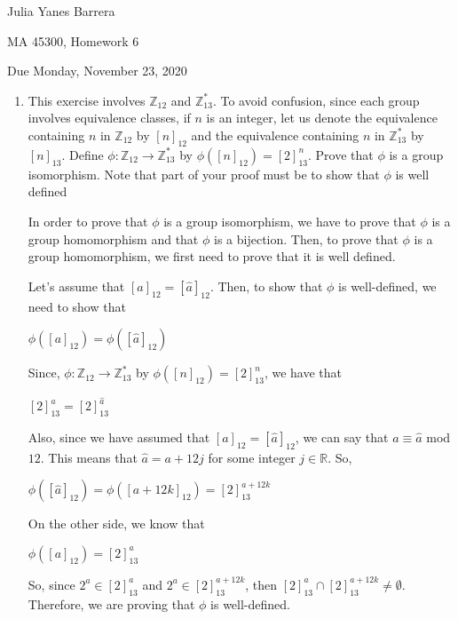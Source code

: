 \documentclass[11pt]{article}
\newcommand{\R}{\mathbb{R}}
\newcommand{\Z}{\mathbb{Z}}
\begin{document}
\begin{flushright}
Julia Yanes Barrera
\end{flushright}


\begin{center} {\LARGE MA 45300, Homework 6}
\end{center} 
 
\begin{center} { Due Monday, November 23, 2020}
\end{center} 



\begin{enumerate}
\item This exercise involves $\Z_{12}$ and $\Z_{13}^*$. To avoid confusion, since each group involves equivalence classes, if $n$ is an integer,  let us denote the equivalence containing $n$ in $\Z_{12}$ by $[n]_{12}$ and the equivalence containing $n$ in $\Z_{13}^*$ by $[n]_{13}$.  Define $\phi: \Z_{12} \rightarrow \Z_{13}^*$ by $\phi([n]_{12}) = [2]^n_{13}$. Prove that $\phi$ is a group isomorphism. Note that part of your proof must be to show that  $\phi$ is well defined 

In order to prove that $\phi$ is a group isomorphism, we have to prove that $\phi$ is a group homomorphism and that $\phi$ is a bijection. Then, to prove that $\phi$ is a group homomorphism, we first need to prove that it is well defined. 

Let's assume that $[a]_{12}=[\widehat a]_{12}$. Then, to show that $\phi$ is well-defined, we need to show that
\begin{center}
$\phi([a]_{12})=\phi([\widehat a]_{12})$
\end{center}

Since, $\phi: \Z_{12} \rightarrow \Z_{13}^*$ by $\phi([n]_{12}) = [2]^n_{13}$, we have that
\begin{center}
$[2]^a_{13}=[2]^{\widehat a}_{13}$
\end{center}

Also, since we have assumed that $[a]_{12}=[\widehat a]_{12}$, we can say that $a\equiv \widehat a$ mod $12$. This means that $\widehat a=a+12j$ for some integer $j\in \R$. So, 

\begin{center}
$\phi([\widehat a]_{12})=\phi([a+12k]_{12})=[2]^{a+12k}_{13}$
\end{center}
On the other side, we know that 
\begin{center}
$\phi([a]_{12})=[2]^a_{13}$
\end{center}
So, since $2^a \in [2]^a_{13}$ and $2^a \in [2]^{a+12k}_{13}$, then $[2]^a_{13}\cap [2]^{a+12k}_{13}\neq\emptyset $. Therefore, we are proving that $\phi$ is well-defined. 


\end{enumerate}
\end{document}
